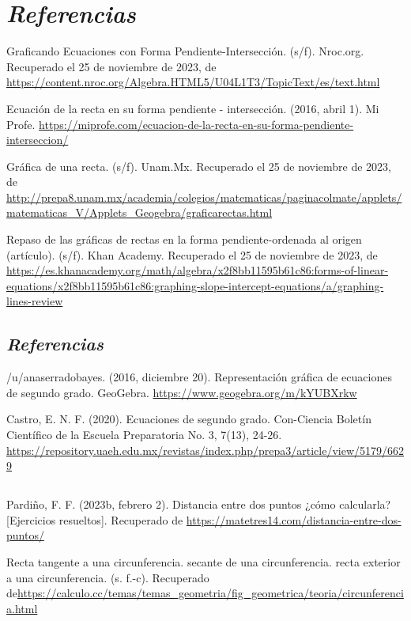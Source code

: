 \documentclass{IEEEcsmag}
\begin{document}
\section{\textbf{\textit{Referencias}}}
\item Graficando Ecuaciones con Forma Pendiente-Intersección. (s/f). Nroc.org. Recuperado el 25 de noviembre de 2023, de \url{https://content.nroc.org/Algebra.HTML5/U04L1T3/TopicText/es/text.html}\\
\item Ecuación de la recta en su forma pendiente - intersección. (2016, abril 1). Mi Profe. \url{https://miprofe.com/ecuacion-de-la-recta-en-su-forma-pendiente-interseccion/} 
\item Gráfica de una recta. (s/f). Unam.Mx. Recuperado el 25 de noviembre de 2023, de \url{http://prepa8.unam.mx/academia/colegios/matematicas/paginacolmate/applets/matematicas_V/Applets_Geogebra/graficarectas.html}
\item Repaso de las gráficas de rectas en la forma pendiente-ordenada al origen (artículo). (s/f). Khan Academy. Recuperado el 25 de noviembre de 2023, de \url{https://es.khanacademy.org/math/algebra/x2f8bb11595b61c86:forms-of-linear-equations/x2f8bb11595b61c86:graphing-slope-intercept-equations/a/graphing-lines-review}

\subsection{\textbf{\textit{Referencias}}} 
\item 
/u/anaserradobayes. (2016, diciembre 20). Representación gráfica de ecuaciones de segundo grado. GeoGebra. 
\url{https://www.geogebra.org/m/kYUBXrkw}\\
\item 
Castro, E. N. F. (2020). Ecuaciones de segundo grado. Con-Ciencia Boletín Científico de la Escuela Preparatoria No. 3, 7(13), 24-26.
\url{https://repository.uaeh.edu.mx/revistas/index.php/prepa3/article/view/5179/6629}
\item 
\subsection{}
\item Pardiño, F. F. (2023b, febrero 2). Distancia entre dos puntos ¿cómo calcularla? [Ejercicios resueltos]. Recuperado de
 \url{https://matetres14.com/distancia-entre-dos-puntos/}\\
\item Recta tangente a una circunferencia. secante de una circunferencia. recta exterior a una circunferencia. (s. f.-c). Recuperado de\url{https://calculo.cc/temas/temas_geometria/fig_geometrica/teoria/circunferencia.html}
\end{document}
